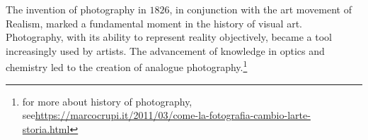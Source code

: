 \noindent The invention of photography in $1826$, in conjunction with the art movement of Realism, marked a fundamental moment in the history of visual art. Photography, with its ability to represent reality objectively, became a tool increasingly used by artists. The advancement of knowledge in optics and chemistry led to the creation of analogue photography.\footnote{for more about history of photography, see\newline\url{https://marcocrupi.it/2011/03/come-la-fotografia-cambio-larte-storia.html}}
